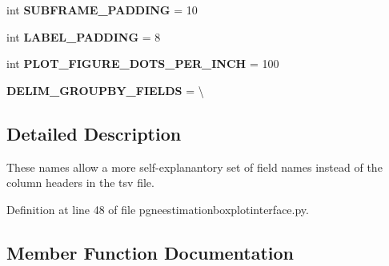 \begin{DoxyCompactItemize}
\item 
int {\bfseries S\+U\+B\+F\+R\+A\+M\+E\+\_\+\+P\+A\+D\+D\+I\+NG} = 10\hypertarget{classnegui_1_1pgneestimationboxplotinterface_1_1PGNeEstimationBoxplotInterface_af2da3890cde606d7bec479f7c7917436}{}\label{classnegui_1_1pgneestimationboxplotinterface_1_1PGNeEstimationBoxplotInterface_af2da3890cde606d7bec479f7c7917436}

\item 
int {\bfseries L\+A\+B\+E\+L\+\_\+\+P\+A\+D\+D\+I\+NG} = 8\hypertarget{classnegui_1_1pgneestimationboxplotinterface_1_1PGNeEstimationBoxplotInterface_a5acdf5dfc9d1bbad144c861db62bf904}{}\label{classnegui_1_1pgneestimationboxplotinterface_1_1PGNeEstimationBoxplotInterface_a5acdf5dfc9d1bbad144c861db62bf904}

\item 
int {\bfseries P\+L\+O\+T\+\_\+\+F\+I\+G\+U\+R\+E\+\_\+\+D\+O\+T\+S\+\_\+\+P\+E\+R\+\_\+\+I\+N\+CH} = 100\hypertarget{classnegui_1_1pgneestimationboxplotinterface_1_1PGNeEstimationBoxplotInterface_a1cab320edc480280dbad93d0cf8ee129}{}\label{classnegui_1_1pgneestimationboxplotinterface_1_1PGNeEstimationBoxplotInterface_a1cab320edc480280dbad93d0cf8ee129}

\item 
{\bfseries D\+E\+L\+I\+M\+\_\+\+G\+R\+O\+U\+P\+B\+Y\+\_\+\+F\+I\+E\+L\+DS} = \textbackslash{}\hypertarget{classnegui_1_1pgneestimationboxplotinterface_1_1PGNeEstimationBoxplotInterface_a7724f45b14e2478ce6b677e712b14011}{}\label{classnegui_1_1pgneestimationboxplotinterface_1_1PGNeEstimationBoxplotInterface_a7724f45b14e2478ce6b677e712b14011}

\end{DoxyCompactItemize}


\subsection{Detailed Description}
\begin{DoxyVerb}These names allow a more self-explanantory set of field names
instead of the column headers in the tsv file.
\end{DoxyVerb}
 

Definition at line 48 of file pgneestimationboxplotinterface.\+py.



\subsection{Member Function Documentation}
